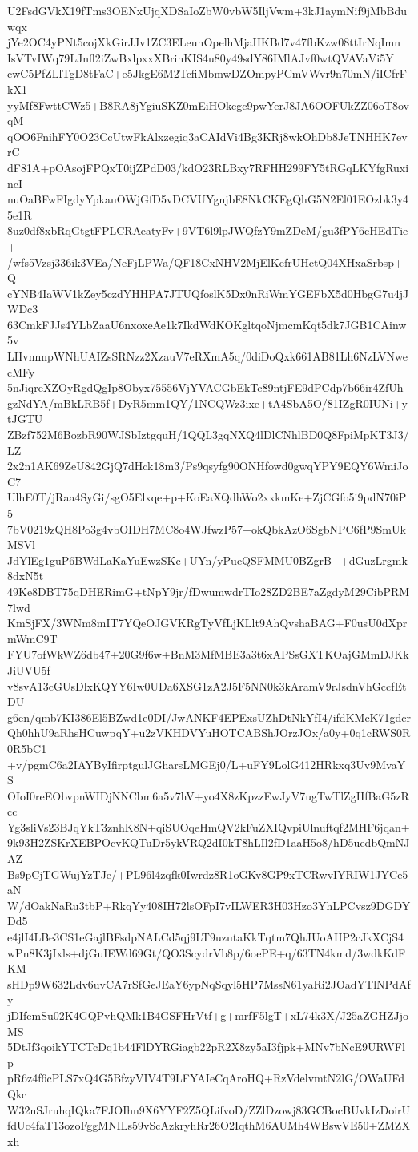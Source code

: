U2FsdGVkX19fTms3OENxUjqXDSaIoZbW0vbW5IljVwm+3kJ1aymNif9jMbBduwqx
jYe2OC4yPNt5cojXkGirJJv1ZC3ELeunOpelhMjaHKBd7v47fbKzw08ttIrNqImn
IsVTvIWq79LJnfl2iZwBxlpxxXBrinKIS4u80y49sdY86IMlAJvf0wtQVAVaVi5Y
cwC5PfZLlTgD8tFaC+e5JkgE6M2TcfiMbmwDZOmpyPCmVWvr9n70mN/iICfrFkX1
yyMf8FwttCWz5+B8RA8jYgiuSKZ0mEiHOkcgc9pwYerJ8JA6OOFUkZZ06oT8ovqM
qOO6FnihFY0O23CcUtwFkAlxzegiq3aCAIdVi4Bg3KRj8wkOhDb8JeTNHHK7evrC
dF81A+pOAsojFPQxT0ijZPdD03/kdO23RLBxy7RFHH299FY5tRGqLKYfgRuxincI
nuOaBFwFIgdyYpkauOWjGfD5vDCVUYgnjbE8NkCKEgQhG5N2El01EOzbk3y45e1R
8uz0df8xbRqGtgtFPLCRAeatyFv+9VT6l9lpJWQfzY9mZDeM/gu3fPY6cHEdTie+
/wfs5Vzsj336ik3VEa/NeFjLPWa/QF18CxNHV2MjElKefrUHctQ04XHxaSrbsp+Q
cYNB4IaWV1kZey5czdYHHPA7JTUQfoslK5Dx0nRiWmYGEFbX5d0HbgG7u4jJWDc3
63CmkFJJs4YLbZaaU6nxoxeAe1k7IkdWdKOKgltqoNjmcmKqt5dk7JGB1CAinw5v
LHvnnnpWNhUAIZsSRNzz2XzauV7eRXmA5q/0diDoQxk661AB81Lh6NzLVNwecMFy
5nJiqreXZOyRgdQgIp8Obyx75556VjYVACGbEkTc89ntjFE9dPCdp7b66ir4ZfUh
gzNdYA/mBkLRB5f+DyR5mm1QY/1NCQWz3ixe+tA4SbA5O/81IZgR0IUNi+ytJGTU
ZBzf752M6BozbR90WJSbIztgquH/1QQL3gqNXQ4lDlCNhlBD0Q8FpiMpKT3J3/LZ
2x2n1AK69ZeU842GjQ7dHck18m3/Ps9qsyfg90ONHfowd0gwqYPY9EQY6WmiJoC7
UlhE0T/jRaa4SyGi/sgO5Elxqe+p+KoEaXQdhWo2xxkmKe+ZjCGfo5i9pdN70iP5
7bV0219zQH8Po3g4vbOIDH7MC8o4WJfwzP57+okQbkAzO6SgbNPC6fP9SmUkMSVl
JdYlEg1guP6BWdLaKaYuEwzSKc+UYn/yPueQSFMMU0BZgrB++dGuzLrgmk8dxN5t
49Ke8DBT75qDHERimG+tNpY9jr/fDwumwdrTIo28ZD2BE7aZgdyM29CibPRM7lwd
KmSjFX/3WNm8mIT7YQeOJGVKRgTyVfLjKLlt9AhQvshaBAG+F0usU0dXprmWmC9T
FYU7ofWkWZ6db47+20G9f6w+BnM3MfMBE3a3t6xAPSsGXTKOajGMmDJKkJiUVU5f
v8svA13cGUsDlxKQYY6Iw0UDa6XSG1zA2J5F5NN0k3kAramV9rJsdnVhGccfEtDU
g6en/qmb7KI386El5BZwd1e0DI/JwANKF4EPExsUZhDtNkYfI4/ifdKMcK71gdcr
Qh0hhU9aRhsHCuwpqY+u2zVKHDVYuHOTCABShJOrzJOx/a0y+0q1cRWS0R0R5bC1
+v/pgmC6a2IAYByIfirptgulJGharsLMGEj0/L+uFY9LolG412HRkxq3Uv9MvaYS
OIoI0reEObvpnWIDjNNCbm6a5v7hV+yo4X8zKpzzEwJyV7ugTwTlZgHfBaG5zRcc
Yg3sliVs23BJqYkT3znhK8N+qiSUOqeHmQV2kFuZXIQvpiUlnuftqf2MHF6jqan+
9k93H2ZSKrXEBPOcvKQTuDr5ykVRQ2dI0kT8hLIl2fD1aaH5o8/hD5uedbQmNJAZ
Bs9pCjTGWujYzTJe/+PL96l4zqfk0Iwrdz8R1oGKv8GP9xTCRwvIYRIW1JYCe5aN
W/dOakNaRu3tbP+RkqYy408IH72lsOFpI7vILWER3H03Hzo3YhLPCvsz9DGDYDd5
e4jlI4LBe3CS1eGajlBFsdpNALCd5qj9LT9uzutaKkTqtm7QhJUoAHP2cJkXCjS4
wPn8K3jIxls+djGuIEWd69Gt/QO3ScydrVb8p/6oePE+q/63TN4kmd/3wdkKdFKM
sHDp9W632Ldv6uvCA7rSfGeJEaY6ypNqSqyl5HP7MssN61yaRi2JOadYTlNPdAfy
jDIfemSu02K4GQPvhQMk1B4GSFHrVtf+g+mrfF5lgT+xL74k3X/J25aZGHZJjoMS
5DtJf3qoikYTCTcDq1b44FlDYRGiagb22pR2X8zy5aI3fjpk+MNv7bNcE9URWFlp
pR6z4f6cPLS7xQ4G5BfzyVIV4T9LFYAIeCqAroHQ+RzVdelvmtN2lG/OWaUFdQkc
W32nSJruhqIQka7FJOIhn9X6YYF2Z5QLifvoD/ZZlDzowj83GCBocBUvkIzDoirU
fdUc4faT13ozoFggMNILs59vScAzkryhRr26O2IqthM6AUMh4WBswVE50+ZMZXxh
